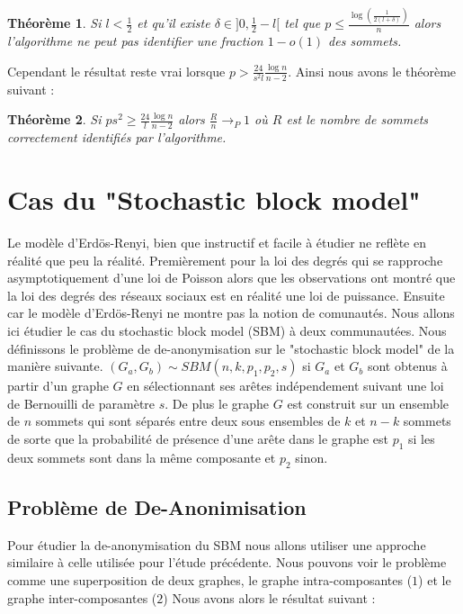 \documentclass[letterpaper,10pt]{llncs}
\newtheorem{theoreme}{Théorème}
\begin{document}
\begin{theoreme}
Si $l < \frac{1}{2}$ et qu'il existe $\delta \in ]0, \frac{1}{2} - l[$ tel que $p \leq \frac{\log(\frac{1}{2(l+\delta)})}{n}$ alors l'algorithme ne peut pas identifier une fraction $1-o(1)$ des sommets.
\end{theoreme}

Cependant le résultat reste vrai lorsque $p>\frac{24}{s^2 l} \frac{\log n}{n - 2}$. Ainsi nous avons le théorème suivant :

\begin{theoreme}
Si $ps^2 \geq \frac{24}{l} \frac{\log n}{n-2}$ alors $\frac{R}{n} \rightarrow_{P} 1$ où $R$ est le nombre de sommets correctement identifiés par l'algorithme.
\end{theoreme}

\section{Cas du "Stochastic block model"}

Le modèle d'Erdös-Renyi, bien que instructif et facile à étudier ne reflète en réalité que peu la réalité. Premièrement pour la loi des degrés qui se rapproche asymptotiquement d'une loi de Poisson alors que les observations ont montré que la loi des degrés des réseaux sociaux est en réalité une loi de puissance. Ensuite car le modèle d'Erdös-Renyi ne montre pas la notion de comunautés. Nous allons ici étudier le cas du stochastic block model (SBM) à deux communautées. 
Nous définissons le problème de de-anonymisation sur le "stochastic block model" de la manière suivante. $(G_a,G_b) \sim SBM(n,k,p_1,p_2,s)$ si $G_a$ et $G_b$  sont obtenus à partir d'un graphe $G$ en sélectionnant ses arêtes indépendement suivant une loi de Bernouilli de paramètre $s$. De plus le graphe $G$ est construit sur un ensemble de $n$ sommets qui sont séparés entre deux sous ensembles de $k$ et $n-k$ sommets de sorte que la probabilité de présence d'une arête dans le graphe est $p_1$ si les deux sommets sont dans la même composante et $p_2$ sinon.

\subsection{Problème de De-Anonimisation}

Pour étudier la de-anonymisation du SBM nous allons utiliser une approche similaire à celle utilisée pour l'étude précédente. Nous pouvons voir le problème comme une superposition de deux graphes, le graphe intra-composantes ($1$) et le graphe inter-composantes ($2$) Nous avons alors le résultat suivant :
\end{document}

